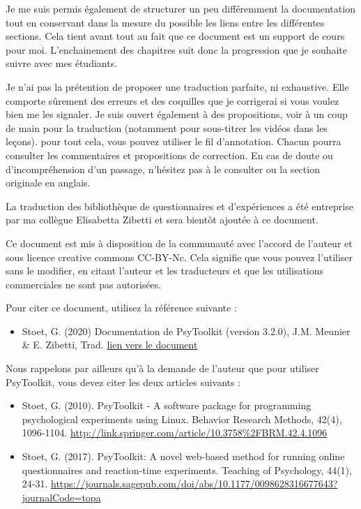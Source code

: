 \documentclass[
]{book}
\providecommand{\tightlist}{%
  \setlength{\itemsep}{0pt}\setlength{\parskip}{0pt}}
\begin{document}
Je me suis permis également de structurer un peu différemment la
documentation tout en conservant dans la mesure du possible les liens
entre les différentes sections. Cela tient avant tout au fait que ce
document est un support de cours pour moi. L'enchainement des chapitres
suit donc la progression que je souhaite suivre avec mes étudiants.

Je n'ai pas la prétention de proposer une traduction parfaite, ni
exhaustive. Elle comporte sûrement des erreurs et des coquilles que je
corrigerai si vous voulez bien me les signaler. Je suis ouvert également
à des propositions, voir à un coup de main pour la traduction (notamment
pour sous-titrer les vidéos dans les leçons). pour tout cela, vous
pouvez utiliser le fil d'annotation. Chacun pourra consulter les
commentaires et propositions de correction. En cas de doute ou
d'incompréhension d'un passage, n'hésitez pas à le consulter ou la
section originale en anglais.

La traduction des bibliothèque de questionnaires et d'expériences a été
entreprise par ma collègue Elisabetta Zibetti et sera bientôt ajoutée à
ce document.

Ce document est mis à disposition de la communauté avec l'accord de
l'auteur et sous licence creative commons CC-BY-Nc. Cela signifie que
vous pouvez l'utiliser sans le modifier, en citant l'auteur et les
traducteurs et que les utilisations commerciales ne sont pas autorisées.

Pour citer ce document, utilisez la référence suivante :

\begin{itemize}
\tightlist
\item
  Stoet, G. (2020) Documentation de PsyToolkit (version 3.2.0), J.M.
  Meunier \& E. Zibetti, Trad.
  \protect\hyperlink{lienux5cux2520versux5cux2520leux5cux2520document}{lien
  vers le document}
\end{itemize}

Nous rappelons par ailleurs qu'à la demande de l'auteur que pour
utiliser PsyToolkit, vous devez citer les deux articles suivants :

\begin{itemize}
\item
  Stoet, G. (2010). PsyToolkit - A software package for programming
  psychological experiments using Linux. Behavior Research Methods,
  42(4), 1096-1104.
  \url{http://link.springer.com/article/10.3758\%2FBRM.42.4.1096}
\item
  Stoet, G. (2017). PsyToolkit: A novel web-based method for running
  online questionnaires and reaction-time experiments. Teaching of
  Psychology, 44(1), 24-31.
  \url{https://journals.sagepub.com/doi/abs/10.1177/0098628316677643?journalCode=topa}
\end{itemize}
\end{document}

